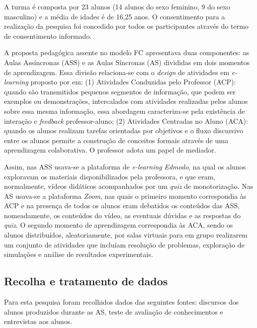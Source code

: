 \documentclass[portuguese]{textolivre}
\begin{document}
A turma é composta por 23 alunos (14 alunos do sexo feminino, 9 do sexo masculino) e a média de idades é de 16,25 anos. O consentimento para a realização da pesquisa foi concedido por todos os participantes através do termo de consentimento informado.

A proposta pedagógica assente no modelo FC apresentava duas componentes: as Aulas Assíncronas (ASS) e as Aulas Síncronas (AS) divididas em dois momentos de aprendizagem. Essa divisão relaciona-se com o \textit{design} de atividades em \textit{e-learning} proposto por \textcite{clark_multimedia_2005} em: (1) Atividades Conduzidas pelo Professor (ACP): quando são transmitidos pequenos segmentos de informação, que podem ser exemplos ou demonstrações, intercalados com atividades realizadas pelos alunos sobre essa mesma informação, essa abordagem caracteriza-se pela existência de interação e \textit{feedback} professor-aluno; (2) Atividades Centradas no Aluno (ACA): quando os alunos realizam tarefas orientadas por objetivos e o fluxo discursivo entre os alunos permite a construção de conceitos formais através de uma aprendizagem colaborativa. O professor adota um papel de mediador.

Assim, nas ASS usava-se a plataforma de \textit{e-learning} \textit{Edmodo}, na qual os alunos exploravam os materiais disponibilizados pela professora, e que eram, normalmente, vídeos didáticos acompanhados por um \textit{quiz} de monotorização. Nas AS usava-se a plataforma \textit{Zoom}, nas quais o primeiro momento correspondia às ACP e na presença de todos os alunos eram debatidos os conteúdos das ASS, nomeadamente, os conteúdos do vídeo, as eventuais dúvidas e as respostas do \textit{quiz}. O segundo momento de aprendizagem correspondia às ACA, sendo os alunos distribuídos, aleatoriamente, por salas virtuais para em grupo realizarem um conjunto de atividades que incluíam resolução de problemas, exploração de simulações e análise de resultados experimentais.

\subsection{Recolha e tratamento de dados}\label{sec-fmt-manuscrito}
Para esta pesquisa foram recolhidos dados das seguintes fontes: discursos dos alunos produzidos durante as AS, teste de avaliação de conhecimentos e entrevistas aos alunos.
\end{document}
